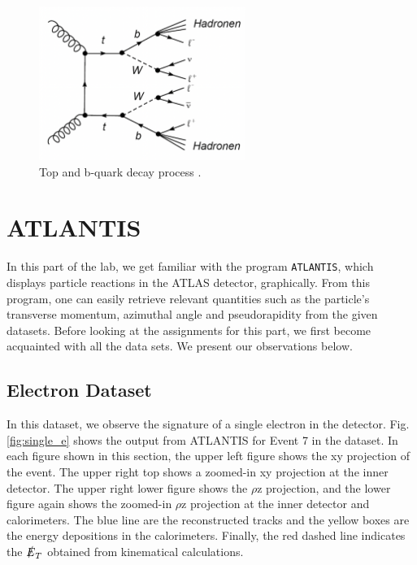 \documentclass[a4paper]{report}
\numberwithin{equation}{section}
\begin{document}
\begin{figure}[htpb]
    \centering
    \includegraphics[width=0.6\textwidth]{bdecay}
    \caption{Top and b-quark decay process \cite{labman}.}
    \label{fig:bdecay}
\end{figure}

\chapter{ATLANTIS} \label{chap:atlantis}

In this part of the lab, we get familiar with the program \texttt{ATLANTIS}, which displays particle reactions in the ATLAS detector, graphically. 
From this program, one can easily retrieve relevant quantities such as the particle's transverse momentum, azimuthal angle and pseudorapidity
from the given datasets. 
Before looking at the assignments for this part, we first become acquainted with all the data sets. We present our observations below. 

\section{Electron Dataset}

In this dataset, we observe the signature of a single electron in the detector. Fig. \ref{fig:single_e} shows the output from ATLANTIS for Event 7 in the 
dataset. In each figure shown in this section, the upper left figure shows the xy projection of the 
event. The upper right top shows a zoomed-in xy projection at the inner detector. The upper right lower figure shows the $\rho$z 
projection, and the lower figure again shows the zoomed-in $\rho$z projection at the inner detector and calorimeters. The blue line
 are the reconstructed tracks and the yellow boxes are the energy depositions in the calorimeters. Finally, the red dashed line 
 indicates the $\slashed{E}_T$ obtained from kinematical calculations.
\end{document}

